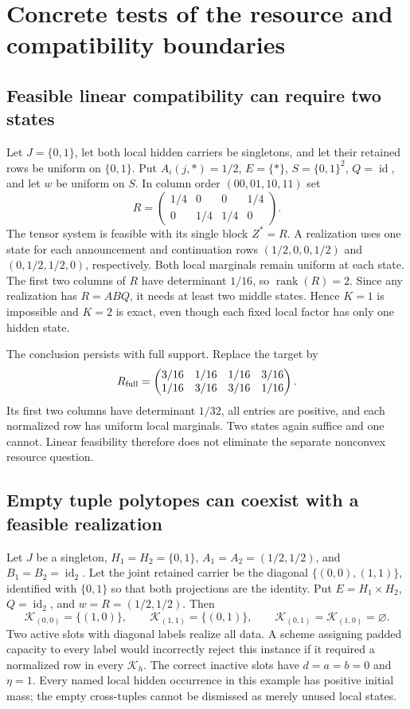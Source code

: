 \documentclass[11pt]{article}
\newcommand{\Kcal}{\mathcal K}
\newcommand{\rank}{\operatorname{rank}}
\newcommand{\Id}{\operatorname{id}}
\theoremstyle{remark}
\begin{document}
\section{Concrete tests of the resource and compatibility boundaries}\label{sec:examples}

\subsection{Feasible linear compatibility can require two states}
Let $J=\{0,1\}$, let both local hidden carriers be singletons, and let their retained rows be uniform on $\{0,1\}$. Put $A_i(j,*)=1/2$, $E=\{*\}$, $S=\{0,1\}^2$, $Q=\Id$, and let $w$ be uniform on $S$. In column order $(00,01,10,11)$ set
\[
 R=\begin{pmatrix}1/4&0&0&1/4\\0&1/4&1/4&0\end{pmatrix}.
\]
The tensor system is feasible with its single block $Z^*=R$. A realization uses one state for each announcement and continuation rows $(1/2,0,0,1/2)$ and $(0,1/2,1/2,0)$, respectively. Both local marginals remain uniform at each state. The first two columns of $R$ have determinant $1/16$, so $\rank(R)=2$. Since any realization has $R=ABQ$, it needs at least two middle states. Hence $K=1$ is impossible and $K=2$ is exact, even though each fixed local factor has only one hidden state.

The conclusion persists with full support. Replace the target by
\[
 R_{\rm full}=\begin{pmatrix}
 3/16&1/16&1/16&3/16\\
 1/16&3/16&3/16&1/16
 \end{pmatrix}.
\]
Its first two columns have determinant $1/32$, all entries are positive, and each normalized row has uniform local marginals. Two states again suffice and one cannot. Linear feasibility therefore does not eliminate the separate nonconvex resource question.

\subsection{Empty tuple polytopes can coexist with a feasible realization}
Let $J$ be a singleton, $H_1=H_2=\{0,1\}$, $A_1=A_2=(1/2,1/2)$, and $B_1=B_2=\Id_2$. Let the joint retained carrier be the diagonal $\{(0,0),(1,1)\}$, identified with $\{0,1\}$ so that both projections are the identity. Put $E=H_1\times H_2$, $Q=\Id_2$, and $w=R=(1/2,1/2)$. Then
\[
 \Kcal_{(0,0)}=\{(1,0)\},\qquad
 \Kcal_{(1,1)}=\{(0,1)\},\qquad
 \Kcal_{(0,1)}=\Kcal_{(1,0)}=\varnothing.
\]
Two active slots with diagonal labels realize all data. A scheme assigning padded capacity to every label would incorrectly reject this instance if it required a normalized row in every $\Kcal_h$. The correct inactive slots have $d=a=b=0$ and $\eta=1$. Every named local hidden occurrence in this example has positive initial mass; the empty cross-tuples cannot be dismissed as merely unused local states.
\end{document}
